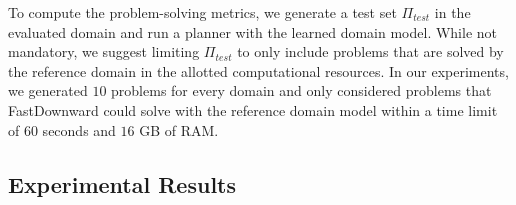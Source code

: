 \documentclass[letterpaper]{article} %
\newcommand{\T}{T}
\newcommand{\Ttrain}{\T_{train}}
\newcommand{\Ttest}{\T_{test}}
\newcommand{\stest}{\ensuremath{S_{\textit{test}}}\xspace}
\newcommand{\ptest}{\ensuremath{\Pi_{\textit{test}}}\xspace}
\newif\ifaddcomments
\newcommand{\roni}[1]{\ifaddcomments{\textcolor{red}{[Roni: #1]}}\fi}
\newcommand{\leo}[1]{\ifaddcomments{\textcolor{pink}{[Leonardo: #1]}}\fi}
\begin{document}
%
To compute the problem-solving metrics, we generate a test set \ptest in the evaluated domain and run a planner with the learned domain model. 
While not mandatory, we suggest limiting \ptest to only include problems that are solved by the reference domain in the allotted computational resources. 
In our experiments, we generated $10$ problems for every domain and only considered problems that FastDownward could solve with the reference domain model within a time limit of $60$ seconds and $16$ GB of RAM. %





%


\subsection{Experimental Results}
% 



\end{document}

